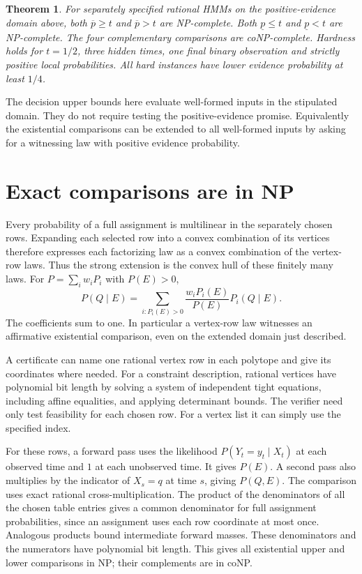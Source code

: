 \documentclass[11pt,a4paper]{amsart}
\newtheorem{theorem}{Theorem}
\begin{document}
\begin{theorem}\label{main}
For separately specified rational HMMs on the positive-evidence
domain above, both \(\overline p\ge t\) and \(\overline p>t\)
are NP-complete. Both \(\underline p\le t\) and
\(\underline p<t\) are NP-complete. The four complementary
comparisons are coNP-complete. Hardness holds for \(t=1/2\),
three hidden times, one final binary observation and strictly
positive local probabilities. All hard instances have lower
evidence probability at least \(1/4\).
\end{theorem}

The decision upper bounds here evaluate well-formed inputs
in the stipulated domain. They do not require testing the
positive-evidence promise. Equivalently the existential
comparisons can be extended to all well-formed inputs by
asking for a witnessing law with positive evidence probability.

\section{Exact comparisons are in NP}

Every probability of a full assignment is multilinear in the
separately chosen rows. Expanding each selected row into a
convex combination of its vertices therefore expresses each
factorizing law as a convex combination of the vertex-row laws.
Thus the strong extension is the convex hull of these finitely
many laws. For \(P=\sum_i w_iP_i\) with \(P(E)>0\),
\[
 P(Q\mid E)=
 \sum_{i:P_i(E)>0}\frac{w_iP_i(E)}{P(E)} P_i(Q\mid E).
\]
The coefficients sum to one. In particular a vertex-row law
witnesses an affirmative existential comparison, even on the
extended domain just described.

A certificate can name one rational vertex row in each
polytope and give its coordinates where needed. For a
constraint description, rational vertices have polynomial bit
length by solving a system of independent tight equations,
including affine equalities, and applying determinant bounds.
The verifier need only test feasibility for each chosen row.
For a vertex list it can simply use the specified index.

For these rows, a forward pass uses the likelihood
\(P(Y_t=y_t\mid X_t)\) at each observed time and \(1\) at
each unobserved time. It gives \(P(E)\). A second pass
also multiplies by the indicator of \(X_s=q\) at time \(s\),
giving \(P(Q,E)\). The comparison uses exact rational
cross-multiplication. The product of the denominators of
all the chosen table entries gives a common denominator
for full assignment probabilities, since an assignment uses
each row coordinate at most once. Analogous products bound
intermediate forward masses. These denominators and the
numerators have polynomial bit length. This gives all
existential upper and lower comparisons in NP; their
complements are in coNP.
\end{document}
